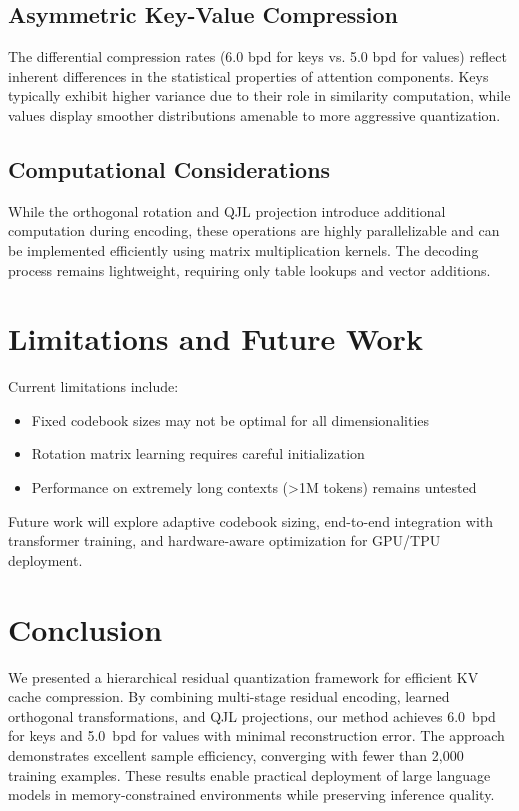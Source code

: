 \documentclass[10pt,conference]{ieeeconf}
\begin{document}
\subsection{Asymmetric Key-Value Compression}
The differential compression rates (6.0 bpd for keys vs. 5.0 bpd for values) reflect inherent differences in the statistical properties of attention components. Keys typically exhibit higher variance due to their role in similarity computation, while values display smoother distributions amenable to more aggressive quantization.

\subsection{Computational Considerations}
While the orthogonal rotation and QJL projection introduce additional computation during encoding, these operations are highly parallelizable and can be implemented efficiently using matrix multiplication kernels. The decoding process remains lightweight, requiring only table lookups and vector additions.

\section{Limitations and Future Work}
Current limitations include:
\begin{itemize}
    \item Fixed codebook sizes may not be optimal for all dimensionalities
    \item Rotation matrix learning requires careful initialization
    \item Performance on extremely long contexts (>1M tokens) remains untested
\end{itemize}

Future work will explore adaptive codebook sizing, end-to-end integration with transformer training, and hardware-aware optimization for GPU/TPU deployment.

\section{Conclusion}
We presented a hierarchical residual quantization framework for efficient KV cache compression. By combining multi-stage residual encoding, learned orthogonal transformations, and QJL projections, our method achieves \SI{6.0}{bpd} for keys and \SI{5.0}{bpd} for values with minimal reconstruction error. The approach demonstrates excellent sample efficiency, converging with fewer than 2,000 training examples. These results enable practical deployment of large language models in memory-constrained environments while preserving inference quality.
\end{document}
